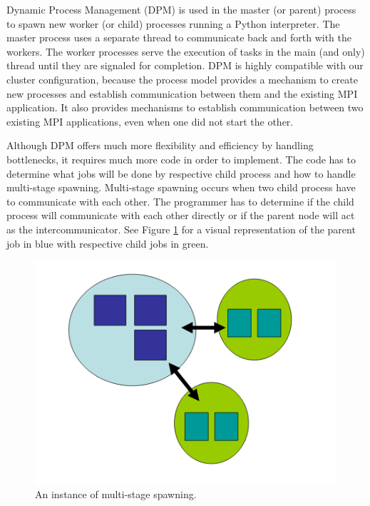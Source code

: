 	Dynamic Process Management (DPM) is used in the master (or parent) process to spawn new worker (or child) processes running a Python interpreter. The master process uses a separate thread to communicate back and forth with the workers. The worker processes serve the execution of tasks in the main (and only) thread until they are signaled for completion. DPM is highly compatible with our cluster configuration, because the process model provides a mechanism to create new processes and establish communication between them and the existing MPI application. It also provides mechanisms to establish communication between two existing MPI applications, even when one did not start the other.

	Although DPM offers much more flexibility and efficiency by handling bottlenecks, it requires much more code in order to implement. The code has to determine what jobs will be done by respective child process and how to handle multi-stage spawning. Multi-stage spawning occurs when two child process have to communicate with each other. The programmer has to determine if the child process will communicate with each other directly or if the parent node will act as the intercommunicator. See Figure \ref{fig:Multi-stage} for a visual representation of the parent job in blue with respective child jobs in green.
	
\begin{figure}
\centering
\includegraphics[scale=0.7]{Figures/multi-stage}
\decoRule
\caption[Multi-stage spawning]{An instance of multi-stage spawning.}
\label{fig:Multi-stage}
\end{figure}

